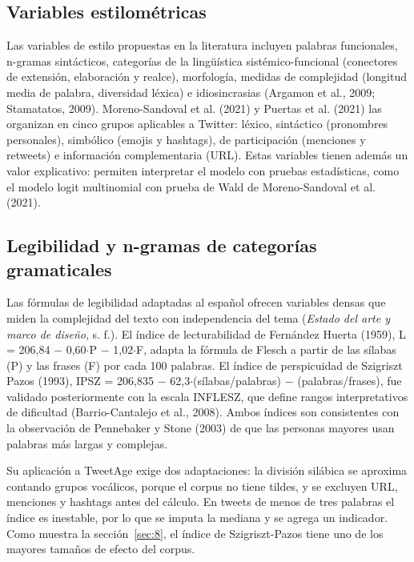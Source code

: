 \documentclass[10pt,twocolumn]{article}
\begin{document}
\subsection{Variables estilométricas}\label{sec:5.4}

Las variables de estilo propuestas en la literatura incluyen palabras funcionales, n-gramas sintácticos, categorías de la lingüística sistémico-funcional (conectores de extensión, elaboración y realce), morfología, medidas de complejidad (longitud media de palabra, diversidad léxica) e idiosincrasias (Argamon et al., 2009; Stamatatos, 2009). Moreno-Sandoval et al. (2021) y Puertas et al. (2021) las organizan en cinco grupos aplicables a Twitter: léxico, sintáctico (pronombres personales), simbólico (emojis y hashtags), de participación (menciones y retweets) e información complementaria (URL). Estas variables tienen además un valor explicativo: permiten interpretar el modelo con pruebas estadísticas, como el modelo logit multinomial con prueba de Wald de Moreno-Sandoval et al. (2021).


\subsection{Legibilidad y n-gramas de categorías gramaticales}\label{sec:5.5}

Las fórmulas de legibilidad adaptadas al español ofrecen variables densas que miden la complejidad del texto con independencia del tema (\textit{Estado del arte y marco de diseño}, s. f.). El índice de lecturabilidad de Fernández Huerta (1959), L = 206,84 $-$ 0,60$\cdot$P $-$ 1,02$\cdot$F, adapta la fórmula de Flesch a partir de las sílabas (P) y las frases (F) por cada 100 palabras. El índice de perspicuidad de Szigriszt Pazos (1993), IPSZ = 206,835 $-$ 62,3$\cdot$(sílabas/palabras) $-$ (palabras/frases), fue validado posteriormente con la escala INFLESZ, que define rangos interpretativos de dificultad (Barrio-Cantalejo et al., 2008). Ambos índices son consistentes con la observación de Pennebaker y Stone (2003) de que las personas mayores usan palabras más largas y complejas.

Su aplicación a TweetAge exige dos adaptaciones: la división silábica se aproxima contando grupos vocálicos, porque el corpus no tiene tildes, y se excluyen URL, menciones y hashtags antes del cálculo. En tweets de menos de tres palabras el índice es inestable, por lo que se imputa la mediana y se agrega un indicador. Como muestra la sección~\ref{sec:8}, el índice de Szigriszt-Pazos tiene uno de los mayores tamaños de efecto del corpus.
\end{document}
